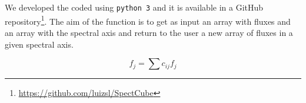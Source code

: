 We developed the coded using \texttt{python 3} and it is available in a GitHub repository\footnote{\url{https://github.com/luizsl/SpectCube}}. The aim of the function is to get as input an array with fluxes and an array with the spectral axis and return to the user a new array of fluxes in a given spectral axis.


\begin{equation}
	f_j = \sum c_{ij}f_j
	\label{}
\end{equation}

